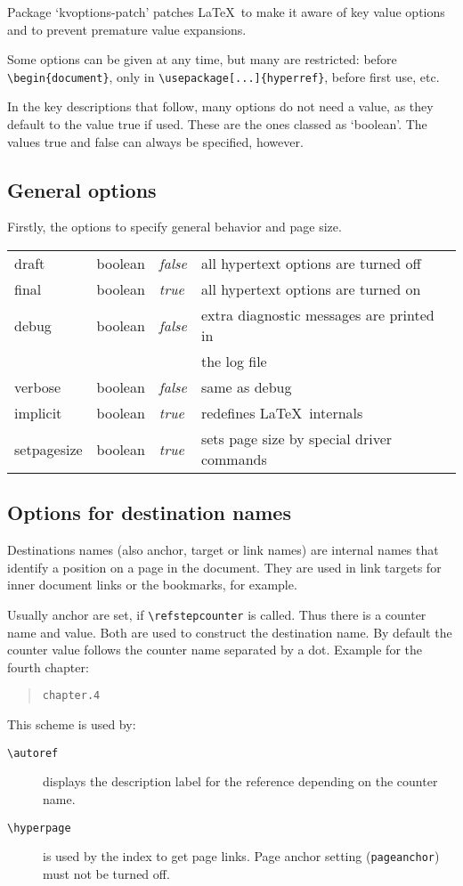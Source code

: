 \documentclass[pdftex]{article}
\newcommand*{\cs}[1]{%
  \texttt{\textbackslash #1}%
}
\begin{document}
Package `kvoptions-patch' patches \LaTeX\ to make it aware
of key value options and to prevent premature value expansions.

Some options can be given at any time, but many are restricted: before
\verb|\begin{document}|, only in \verb|\usepackage[...]{hyperref}|,
before first use, etc.

In the key descriptions that follow, many options do not need a value,
as they default to the value true if used. These are the ones classed as
`boolean'. The values true and false can always be specified, however.

\subsection{General options}

Firstly, the options to specify general behavior and page size.

\medskip
\noindent\begin{longtable}{>{\ttfamily}ll>{\itshape}ll}
draft          & boolean & false & all hypertext options are turned off \\
final          & boolean & true  & all hypertext options are turned on \\
debug          & boolean & false & extra diagnostic messages are printed in \\
               &         &       & the log file \\
verbose        & boolean & false & same as debug \\
implicit       & boolean & true  & redefines \LaTeX\ internals \\
setpagesize    & boolean & true  & sets page size by special driver commands
\end{longtable}

\subsection{Options for destination names}

Destinations names (also anchor, target or link names) are internal
names that identify a position on a page in the document. They
are used in link targets for inner document links or the bookmarks,
for example.

Usually anchor are set, if \cs{refstepcounter} is called.
Thus there is a counter name and value. Both are used to
construct the destination name. By default the counter value
follows the counter name separated by a dot. Example for
the fourth chapter:
\begin{quote}
  \verb|chapter.4|
\end{quote}
This scheme is used by:
\begin{description}
\item[\cs{autoref}] displays the description label for the
  reference depending on the counter name.
\item[\cs{hyperpage}] is used by the index to get
page links. Page anchor setting (\verb|pageanchor|) must not
be turned off.
\end{description}
\end{document}
